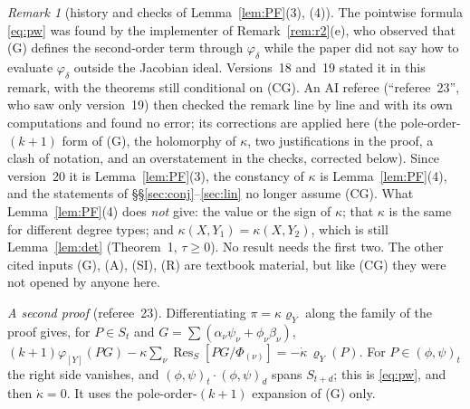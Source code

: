 \documentclass[11pt]{article}
\numberwithin{equation}{section}
\theoremstyle{remark}
\newtheorem{remark}[theorem]{Remark}
\newcommand{\Res}{\operatorname{Res}}
\begin{document}
\begin{remark}[history and checks of Lemma~\ref{lem:PF}(3), (4)]\label{rem:pw}
The pointwise formula \eqref{eq:pw} was found by the implementer of Remark~\ref{rem:r2}(e), who observed that
(G) defines the second-order term through $\varphi_\delta$ while the paper did not say how to evaluate
$\varphi_\delta$ outside the Jacobian ideal. Versions~18 and~19 stated it in this remark, with the theorems still
conditional on (CG). An AI referee (``referee~23'', who saw only version~19) then checked the remark line by line and with its own
computations and found no error; its corrections are applied here (the pole-order-$(k+1)$ form of (G), the
holomorphy of $\kappa$, two justifications in the proof, a clash of notation, and an overstatement in the checks,
corrected below). Since version~20 it is Lemma~\ref{lem:PF}(3), the constancy of $\kappa$ is
Lemma~\ref{lem:PF}(4), and the statements of \S\S\ref{sec:conj}--\ref{sec:lin} no longer assume (CG).
What Lemma~\ref{lem:PF}(4) does \emph{not} give: the value or the sign of $\kappa$; that $\kappa$ is the same for
different degree types; and $\kappa(X,Y_1)=\kappa(X,Y_2)$, which is still Lemma~\ref{lem:det} (Theorem~1,
$\tau\ge0$). No result needs the first two. The other cited inputs (G), (A), (SI), (R) are textbook material, but
like (CG) they were not opened by anyone here.

\emph{A second proof} (referee~23). Differentiating $\pi=\kappa\varrho_Y$ along the family of the proof gives, for
$P\in S_t$ and $G=\sum(\alpha_\nu\psi_\nu+\phi_\nu\beta_\nu)$,
$(k+1)\varphi_{[Y]}(PG)-\kappa\sum_\nu\Res_S[PG/\Phi_{(\nu)}]=-\dot\kappa\,\varrho_Y(P)$. For $P\in(\phi,\psi)_t$ the right
side vanishes, and $(\phi,\psi)_t\cdot(\phi,\psi)_d$ spans $S_{t+d}$; this is \eqref{eq:pw}, and then $\dot\kappa=0$.
It uses the pole-order-$(k+1)$ expansion of (G) only.


\end{remark}
\end{document}

